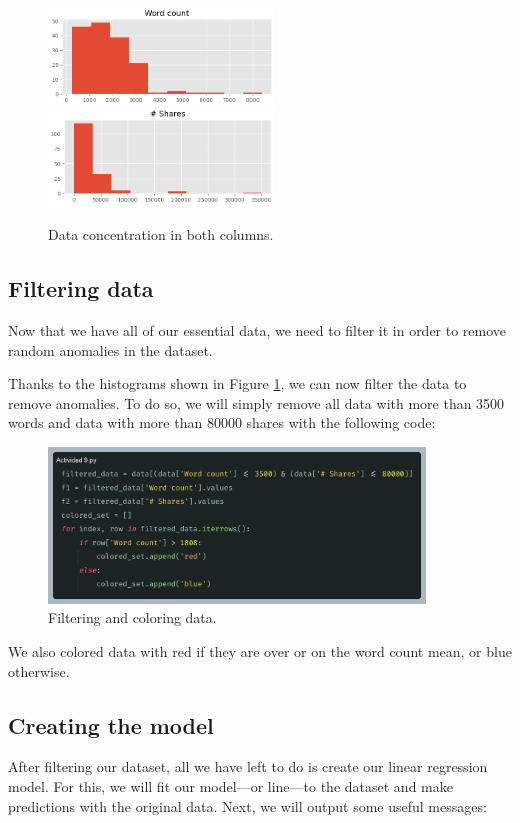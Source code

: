 \documentclass[10pt]{article}
\begin{document}
\begin{figure}[h]
  \centering
  \includegraphics[width=60mm]{word_count_hist.png}
  \includegraphics[width=60mm]{nshares_count_hist.png}
  \caption{Data concentration in both columns.}
  \label{fig:histograms}
\end{figure}

\subsection{Filtering data}
Now that we have all of our essential data, we need to filter it in order to remove random anomalies in the dataset. \par

Thanks to the histograms shown in Figure \ref{fig:histograms}, we can now filter the data to remove anomalies. To do so, we will simply remove all data with more than 3500 words and data with more than 80000 shares with the following code: \par

\begin{figure}[h]
  \centering
  \includegraphics[width=100mm]{2025-03-26-14-45-21.png}
  \caption{Filtering and coloring data.}
\end{figure}

We also colored data with red if they are over or on the word count mean, or blue otherwise.

\subsection{Creating the model}
After filtering our dataset, all we have left to do is create our linear regression model. For this, we will fit our model---or line---to the dataset and make predictions with the original data. Next, we will output some useful messages: \par
\end{document}
